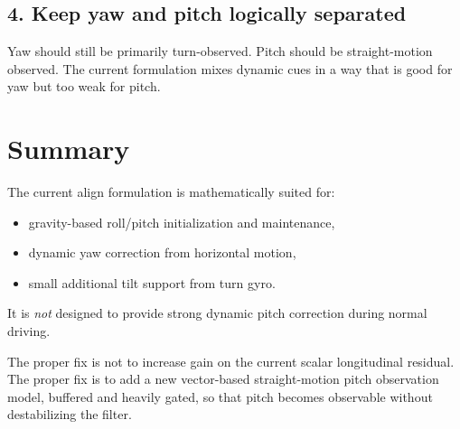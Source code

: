 \documentclass[11pt]{article}
\begin{document}
\subsection{4. Keep yaw and pitch logically separated}
Yaw should still be primarily turn-observed. Pitch should be straight-motion observed. The current formulation mixes dynamic cues in a way that is good for yaw but too weak for pitch.

\section{Summary}
The current align formulation is mathematically suited for:
\begin{itemize}[leftmargin=1.5em]
\item gravity-based roll/pitch initialization and maintenance,
\item dynamic yaw correction from horizontal motion,
\item small additional tilt support from turn gyro.
\end{itemize}

It is \emph{not} designed to provide strong dynamic pitch correction during normal driving.

The proper fix is not to increase gain on the current scalar longitudinal residual. The proper fix is to add a new vector-based straight-motion pitch observation model, buffered and heavily gated, so that pitch becomes observable without destabilizing the filter.
\end{document}
